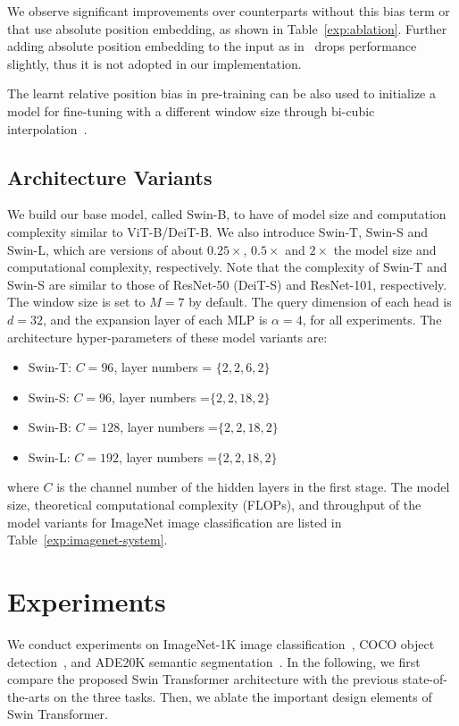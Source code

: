 \documentclass[10pt,twocolumn,letterpaper]{article}
\begin{document}
We observe significant improvements over counterparts without this bias term or that use absolute position embedding, as shown in Table~\ref{exp:ablation}. Further adding absolute position embedding to the input as in~\cite{dosovitskiy2020vit} drops performance slightly, thus it is not adopted in our implementation.

The learnt relative position bias in pre-training can be also used to initialize a model for fine-tuning with a different window size through bi-cubic interpolation~\cite{dosovitskiy2020vit,touvron2020deit}.

\subsection{Architecture Variants}

We build our base model, called Swin-B, to have of model size and computation complexity similar to ViT-B/DeiT-B. We also introduce Swin-T, Swin-S and Swin-L, which are versions of about $0.25\times$, $0.5\times$ and $2\times$ the model size and computational complexity, respectively. Note that the complexity of Swin-T and Swin-S are similar to those of ResNet-50 (DeiT-S) and ResNet-101, respectively. The window size is set to $M=7$ by default. The query dimension of each head is $d=32$, and the expansion layer of each MLP is $\alpha=4$, for all experiments. The architecture hyper-parameters of these model variants are:
\begin{itemize}
    \item Swin-T: $C=96$, layer numbers = $\{2, 2, 6, 2\}$
    \item Swin-S: $C=96$, layer numbers =$\{2, 2, 18, 2\}$
    \item Swin-B: $C=128$, layer numbers =$\{2, 2, 18, 2\}$
    \item Swin-L: $C=192$, layer numbers =$\{2, 2, 18, 2\}$ 
\end{itemize}
where $C$ is the channel number of the hidden layers in the first stage. The model size, theoretical computational complexity (FLOPs), and throughput of the model variants for ImageNet image classification are listed in Table~\ref{exp:imagenet-system}. 

\section{Experiments}

We conduct experiments on ImageNet-1K image classification~\cite{deng2009imagenet}, COCO object detection~\cite{lin2014coco}, and ADE20K semantic segmentation~\cite{zhou2018semantic}. In the following, we first compare the proposed Swin Transformer architecture with the previous state-of-the-arts on the three tasks. Then, we ablate the important design elements of Swin Transformer.
\end{document}
